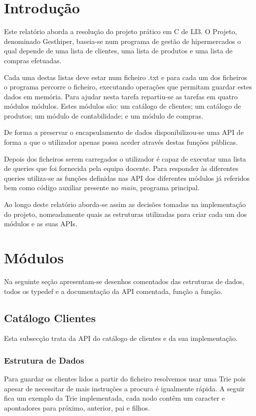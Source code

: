 \documentclass[10pt] {article}
\begin{document}
\section{Introdução}
\par Este relatório aborda a resolução do projeto prático em C de LI3. O Projeto, denominado Gesthiper, baseia-se
num programa de gestão de hipermercados o qual depende de uma lista de clientes, uma lista de produtos e uma
lista de compras efetuadas. \par Cada uma destas listas deve estar num ficheiro .txt e para cada um dos ficheiros o
programa percorre o ficheiro, executando operações que permitam guardar estes dados em memória. Para ajudar nesta tarefa repartiu-se as tarefas em quatro módulos
módulos. Estes módulos são: um catálogo de clientes; um catálogo de produtos; um módulo de contabilidade; e um módulo de compras.
\par De forma a preservar o encapsulamento de dados disponibilizou-se uma API de
forma a que o utilizador apenas possa aceder através destas funções públicas.
\par Depois dos ficheiros serem carregados o utilizador é capaz de executar uma lista de queries que
foi fornecida pela equipa docente. Para responder às diferentes queries utiliza-se as funções definidas nas API dos diferentes
módulos já referidos bem como código auxiliar presente no \emph{main}, programa principal.
\par Ao longo deste relatório aborda-se assim as decisões tomadas na implementação do projeto, nomeadamente quais as estruturas utilizadas para criar cada um dos módulos e as suas APIs.

\newpage
\section{Módulos}
Na seguinte seção apresentam-se desenhos comentados das estruturas de dados,
todos os typedef e a documentação da API comentada, função a função.


\subsection{Catálogo Clientes}
\par Esta subsecção trata da API do catálogo de clientes e da sua implementação.

\subsubsection{Estrutura de Dados}
\par
Para guardar os clientes lidos a partir do ficheiro resolvemos usar uma Trie pois apesar de
necessitar de mais instruções a procura é igualmente rápida. A seguir fica um exemplo da Trie implementada,
cada nodo contêm um caracter e apontadores para próximo, anterior, pai e filhos.
\end{document}
